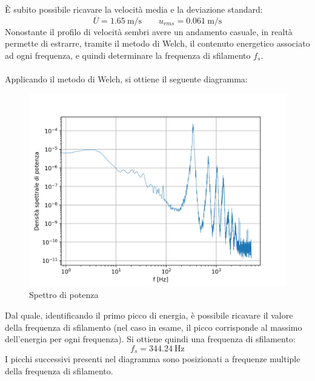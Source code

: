 \noindent È subito possibile ricavare la velocità media e la deviazione standard:
\begin{equation*}
    \overline U = 1.65\ \text{m/s} \qquad u_{rms} = 0.061\ \text{m/s}
\end{equation*}
Nonostante il profilo di velocità sembri avere un andamento casuale, in realtà permette di estrarre, tramite il metodo di Welch, il contenuto energetico associato ad ogni frequenza, e quindi determinare la frequenza di sfilamento $f_s$.\\\\
Applicando il metodo di Welch, si ottiene il seguente diagramma:
\begin{figure}[H]
    \centering
    \includegraphics[width=.9\textwidth]{images/10/welch.png}
    \caption{Spettro di potenza}
\end{figure}

\noindent Dal quale, identificando il primo picco di energia, è possibile ricavare il valore della frequenza di sfilamento (nel caso in esame, il picco corrisponde al massimo dell'energia per ogni frequenza). Si ottiene quindi una frequenza di sfilamento:
\begin{equation*}
    f_s = 344.24\ \text{Hz}
\end{equation*}
I picchi successivi presenti nel diagramma sono posizionati a frequenze multiple della frequenza di sfilamento.

\newpage
